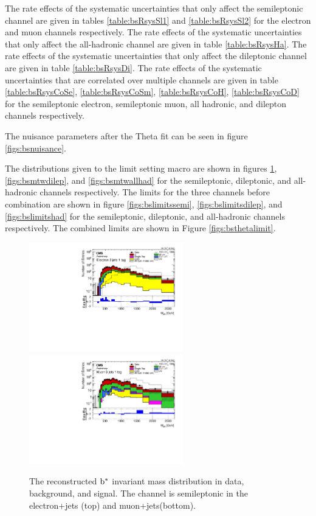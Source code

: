 The rate effects of the systematic uncertainties that only affect the semileptonic channel are given in tables \ref{table:bsRsysSl1} and \ref{table:bsRsysSl2}  for the electron and muon channels respectively.
The rate effects of the systematic uncertainties that only affect the all-hadronic channel are given in table \ref{table:bsRsysHa}.
The rate effects of the systematic uncertainties that only affect the dileptonic channel are given in table \ref{table:bsRsysDi}.
The rate effects of the systematic uncertainties that are correlated over multiple channels are given in table \ref{table:bsRsysCoSe}, \ref{table:bsRsysCoSm}, 
\ref{table:bsRsysCoH}, \ref{table:bsRsysCoD} for the semileptonic electron, semileptonic muon, all hadronic, and dilepton channels respectively.

The nuisance parameters after the Theta fit can be seen in figure \ref{figs:bsnuisance}.

The distributions given to the limit setting macro are shown in figures \ref{figs:bsmtwsemi}, \ref{figs:bsmtwdilep}, and \ref{figs:bsmtwallhad} for the semileptonic, dileptonic, and all-hadronic 
channels respectively.  The limits for the three channels before combination are shown in figure \ref{figs:bslimitssemi}, \ref{figs:bslimitsdilep}, and \ref{figs:bslimitshad}  for the semileptonic, dileptonic, and all-hadronic 
channels respectively.  The combined limits are shown in Figure \ref{figs:bsthetalimit}.  


\begin{figure}[htcb]
\centering
\includegraphics[width=0.6\textwidth]{AN-14-049/figs/bstarLeptonJetdataMC_CompEl1+j53XallJetLeptonMETMass_logy}
\includegraphics[width=0.6\textwidth]{AN-14-049/figs/bstarLeptonJetdataMC_CompMu1+j53XallJetLeptonMETMass_logy}
\caption{The reconstructed $\mathrm{b}^{*}$ invariant mass distribution in data, background, and signal.  The channel is semileptonic in the electron+jets (top) and muon+jets(bottom). }
\label{figs:bsmtwsemi}
\end{figure}


